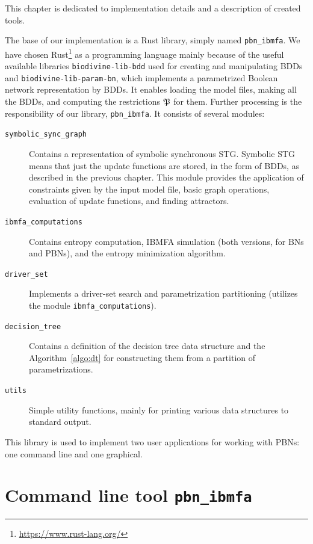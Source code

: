 \documentclass[
	digital, oneside, nosansbold, nocolorbold, nolot, nolof
]{fithesis4}
\theoremstyle{definition}
\theoremstyle{definition}
\begin{document}
This chapter is dedicated to implementation details and a description of
created tools.

The base of our implementation is a Rust library, simply named
\texttt{pbn\_ibmfa}. We have chosen
Rust\footnote{\url{https://www.rust-lang.org/}} as a programming language
mainly because of the useful available libraries \texttt{biodivine-lib-bdd}
used for creating and manipulating BDDs and \texttt{biodivine-lib-param-bn},
which implements a parametrized Boolean network representation by BDDs. It
enables loading the model files, making all the BDDs, and computing
the restrictions $\mathfrak{P}$ for them. Further processing is the
responsibility of our library, \texttt{pbn\_ibmfa}. It consists of several
modules:
\begin{description}
\item[\texttt{symbolic\_sync\_graph}] Contains a representation of symbolic
    synchronous STG. Symbolic STG means that just the update functions are
    stored, in the form of BDDs, as described in the previous chapter. This
    module provides the application of constraints given by the input model
    file, basic graph operations, evaluation of update functions, and
    finding attractors.
\item[\texttt{ibmfa\_computations}] Contains entropy computation, IBMFA
    simulation (both versions, for BNs and PBNs), and the entropy minimization
    algorithm.
\item[\texttt{driver\_set}] Implements a driver-set search and parametrization
    partitioning (utilizes the module \texttt{ibmfa\_computations}).
\item[\texttt{decision\_tree}] Contains a definition of the decision tree data
    structure and the Algorithm~\ref{algo:dt} for constructing them from a
    partition of parametrizations.
\item[\texttt{utils}] Simple utility functions, mainly for printing various
    data structures to standard output.
\end{description}

This library is used to implement two user applications for working with PBNs:
one command line and one graphical.

\section{Command line tool \texttt{pbn\_ibmfa}}
\end{document}
